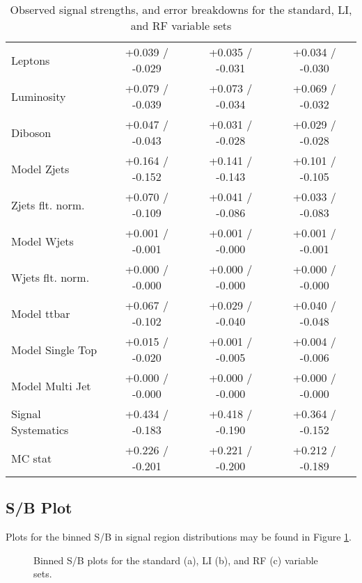 \begin{table}[!htbp]
\begin{center}
\begin{tabular}{lccc}
Leptons &  +0.039 / -0.029  &  +0.035 / -0.031  &  +0.034 / -0.030 \\
Luminosity &  +0.079 / -0.039  &  +0.073 / -0.034  &  +0.069 / -0.032 \\
Diboson &  +0.047 / -0.043  &  +0.031 / -0.028  &  +0.029 / -0.028 \\
Model Zjets &  +0.164 / -0.152  &  +0.141 / -0.143  &  +0.101 / -0.105 \\
Zjets flt. norm. &  +0.070 / -0.109  &  +0.041 / -0.086  &  +0.033 / -0.083 \\
Model Wjets &  +0.001 / -0.001  &  +0.001 / -0.000  &  +0.001 / -0.001 \\
Wjets flt. norm. &  +0.000 / -0.000  &  +0.000 / -0.000  &  +0.000 / -0.000 \\
Model ttbar &  +0.067 / -0.102  &  +0.029 / -0.040  &  +0.040 / -0.048 \\
Model Single Top &  +0.015 / -0.020  &  +0.001 / -0.005  &  +0.004 / -0.006 \\
Model Multi Jet &  +0.000 / -0.000  &  +0.000 / -0.000  &  +0.000 / -0.000 \\
Signal Systematics &  +0.434 / -0.183  &  +0.418 / -0.190  &  +0.364 / -0.152 \\
MC stat &  +0.226 / -0.201  &  +0.221 / -0.200  &  +0.212 / -0.189 \\
\hline\hline
\end{tabular}
\end{center}
\caption{Observed signal strengths, and error breakdowns for the standard, LI, and RF variable sets}
\label{tab:breakdownobs}
\end{table}
\clearpage
\subsection{S/B Plot}
Plots for the binned S/B in signal region distributions may be found in Figure \ref{fig:SoB}.

\begin{figure}[!htbp]
  \centering
    \caption{Binned S/B plots for the standard (a), LI (b), and RF (c) variable sets.}
    \label{fig:SoB}
\end{figure}


